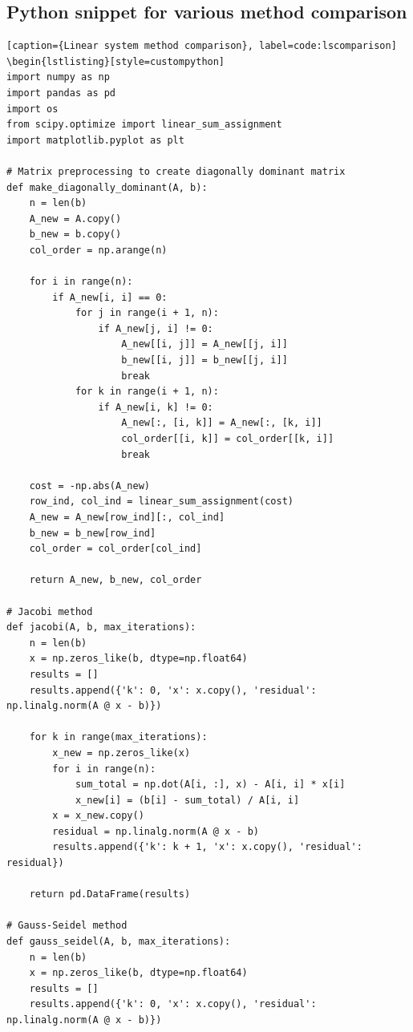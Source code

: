 \documentclass[10pt]{article}
\begin{document}
\subsection{Python snippet for various method comparison}
\begin{lstlisting}[style=custompython][caption={Linear system method comparison}, label=code:lscomparison]
\begin{lstlisting}[style=custompython]
import numpy as np
import pandas as pd
import os
from scipy.optimize import linear_sum_assignment
import matplotlib.pyplot as plt

# Matrix preprocessing to create diagonally dominant matrix
def make_diagonally_dominant(A, b):
    n = len(b)
    A_new = A.copy()
    b_new = b.copy()
    col_order = np.arange(n)
    
    for i in range(n):
        if A_new[i, i] == 0:
            for j in range(i + 1, n):
                if A_new[j, i] != 0:
                    A_new[[i, j]] = A_new[[j, i]]
                    b_new[[i, j]] = b_new[[j, i]]
                    break
            for k in range(i + 1, n):
                if A_new[i, k] != 0:
                    A_new[:, [i, k]] = A_new[:, [k, i]]
                    col_order[[i, k]] = col_order[[k, i]]
                    break
    
    cost = -np.abs(A_new)
    row_ind, col_ind = linear_sum_assignment(cost)
    A_new = A_new[row_ind][:, col_ind]
    b_new = b_new[row_ind]
    col_order = col_order[col_ind]
    
    return A_new, b_new, col_order

# Jacobi method
def jacobi(A, b, max_iterations):
    n = len(b)
    x = np.zeros_like(b, dtype=np.float64)
    results = []
    results.append({'k': 0, 'x': x.copy(), 'residual': np.linalg.norm(A @ x - b)})
    
    for k in range(max_iterations):
        x_new = np.zeros_like(x)
        for i in range(n):
            sum_total = np.dot(A[i, :], x) - A[i, i] * x[i]
            x_new[i] = (b[i] - sum_total) / A[i, i]
        x = x_new.copy()
        residual = np.linalg.norm(A @ x - b)
        results.append({'k': k + 1, 'x': x.copy(), 'residual': residual})
    
    return pd.DataFrame(results)

# Gauss-Seidel method
def gauss_seidel(A, b, max_iterations):
    n = len(b)
    x = np.zeros_like(b, dtype=np.float64)
    results = []
    results.append({'k': 0, 'x': x.copy(), 'residual': np.linalg.norm(A @ x - b)})
    

\end{lstlisting}
\end{document}
